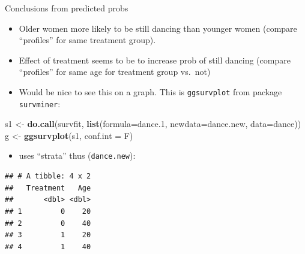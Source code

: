\documentclass[ignorenonframetext,]{beamer}
\newenvironment{Shaded}{\begin{snugshade}}{\end{snugshade}}
\newcommand{\DataTypeTok}[1]{\textcolor[rgb]{0.13,0.29,0.53}{#1}}
\newcommand{\FloatTok}[1]{\textcolor[rgb]{0.00,0.00,0.81}{#1}}
\newcommand{\KeywordTok}[1]{\textcolor[rgb]{0.13,0.29,0.53}{\textbf{#1}}}
\newcommand{\NormalTok}[1]{#1}
\newcommand{\StringTok}[1]{\textcolor[rgb]{0.31,0.60,0.02}{#1}}
\providecommand{\tightlist}{%
  \setlength{\itemsep}{0pt}\setlength{\parskip}{0pt}}
\begin{document}
\begin{frame}[fragile]{Conclusions from predicted probs}
\protect\hypertarget{conclusions-from-predicted-probs}{}

\begin{itemize}
\item
  Older women more likely to be still dancing than younger women
  (compare ``profiles'' for same treatment group).
\item
  Effect of treatment seems to be to increase prob of still dancing
  (compare ``profiles'' for same age for treatment group vs.~not)
\item
  Would be nice to see this on a graph. This is \texttt{ggsurvplot} from
  package \texttt{survminer}:
\end{itemize}

\begin{Shaded}
\begin{Highlighting}[]
\NormalTok{s1 <-}\StringTok{ }\KeywordTok{do.call}\NormalTok{(survfit, }\KeywordTok{list}\NormalTok{(}\DataTypeTok{formula=}\NormalTok{dance}\FloatTok{.1}\NormalTok{, }\DataTypeTok{newdata=}\NormalTok{dance.new, }\DataTypeTok{data=}\NormalTok{dance))}
\NormalTok{g <-}\StringTok{ }\KeywordTok{ggsurvplot}\NormalTok{(s1, }\DataTypeTok{conf.int =}\NormalTok{ F)}
\end{Highlighting}
\end{Shaded}

\begin{itemize}
\tightlist
\item
  uses ``strata'' thus (\texttt{dance.new}):
\end{itemize}

\footnotesize

\begin{verbatim}
## # A tibble: 4 x 2
##   Treatment   Age
##       <dbl> <dbl>
## 1         0    20
## 2         0    40
## 3         1    20
## 4         1    40
\end{verbatim}

\normalsize

\end{frame}
\end{document}
